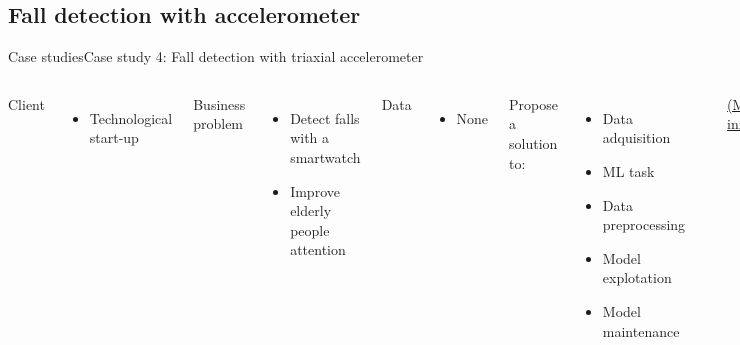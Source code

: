 \documentclass[10pt,compress]{beamer} %
\begin{document}
\subsection{Fall detection with accelerometer}
\begin{frame}{Case studies}{Case study 4: Fall detection with triaxial accelerometer}
    \begin{columns}
	   \small{
		Client
		\begin{itemize}
			\item Technological start-up
		\end{itemize}
		Business problem
		\begin{itemize}
			\item Detect falls with a smartwatch
			\item Improve elderly people attention
		\end{itemize}
		Data
		\begin{itemize}
			\item None
		\end{itemize}
		Propose a solution to:
		\begin{itemize}
			\item Data adquisition
			\item ML task
			\item Data preprocessing
			\item Model explotation
			\item Model maintenance
		\end{itemize}
		}
			\includegraphics[width=\linewidth]{figs/HFall.pdf}

			\centering \href{https://www.slideshare.net/DavidFBarrero/triaxial-accelerometer-located-on-the-wrist-for-elderly-peoples-fall-detection}{(More info)}
    \end{columns}
\end{frame}
\end{document}
